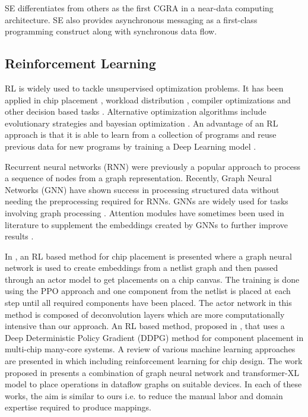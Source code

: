 SE differentiates from others as the first CGRA in a near-data computing architecture.
SE also provides asynchronous messaging as a first-class programming construct along with synchronous data flow. 


\subsection{Reinforcement Learning}
RL is widely used to tackle unsupervised optimization problems.
It has been applied in chip placement \cite{mirhoseini2020chip}, workload distribution \cite{Mirhoseini_placementRNN, addanki2019placeto, zhou2019gdp}, compiler optimizations \cite{Zhou_compileGNN} and other decision based tasks \cite{kormushev2013reinforcement, ZophL16_NASRL}. 
Alternative optimization algorithms include evolutionary strategies \cite{Zhichao_ESNAS} and bayesian optimization \cite{shi2020learned}. 
An advantage of an RL approach is that it is able to learn from a collection of programs and reuse previous data for new programs by training a Deep Learning model \cite{zhou2019gdp}.

Recurrent neural networks (RNN) \cite{hochreiter1996lstm} were previously a popular approach to process a sequence of nodes from a graph representation. 
Recently, Graph Neural Networks (GNN) \cite{gori2005new} have shown success in processing structured data without needing the preprocessing required for RNNs.
GNNs are widely used for tasks involving graph processing \cite{Zhou_compileGNN, zhou2019gdp}. 
Attention modules have sometimes been used in literature to supplement the embeddings created by GNNs to further improve results \cite{addanki2019placeto}.

In \cite{mirhoseini2020chip}, an RL based method for chip placement is presented where a graph neural network is used to create embeddings from a netlist graph and then passed through an actor model to get placements on a chip canvas.
The training is done using the PPO approach and one component from the netlist is placed at each step until all required components have been placed.
The actor network in this method is composed of deconvolution layers which are more computationally intensive than our approach. 
An RL based method, proposed in \cite{wu_core_2020}, that uses a Deep Deterministic Policy Gradient (DDPG) method for component placement in multi-chip many-core systems.
A review of various machine learning approaches are presented in \cite{khailany_accelerating_2020} which including reinforcement learning for chip design.
The work proposed in \cite{zhou2019gdp} presents a combination of graph neural network and transformer-XL model to place operations in dataflow graphs on suitable devices.
In each of these works, the aim is similar to ours i.e. to reduce the manual labor and domain expertise required to produce mappings.

